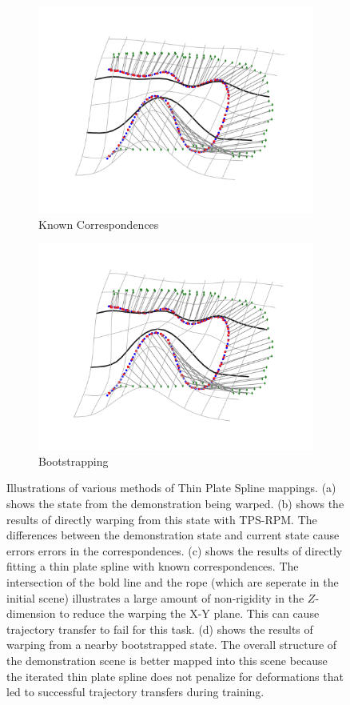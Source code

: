 \begin{figure}
\begin{subfigure}[b]{.48\linewidth}
    \includegraphics[width=\textwidth]{figs/warp_root_known.pdf}
    \caption{Known Correspondences}
    \label{fig:corresponds}
  \end{subfigure}
  \begin{subfigure}[b]{.48\linewidth}
    \includegraphics[width=\textwidth]{figs/warp_derived.pdf}
    \caption{Bootstrapping}
    \label{fig:bootstrap}
  \end{subfigure}
  \caption{Illustrations of various methods of Thin Plate Spline mappings.
  (a) shows the state from the demonstration being warped. (b) shows the results of directly warping from this state with TPS-RPM. The differences between the demonstration state and current state cause errors errors in the correspondences. (c) shows the results of directly fitting a thin plate spline with known correspondences. The intersection of the bold line and the rope (which are seperate in the initial scene) illustrates a large amount of non-rigidity in the $Z$-dimension to reduce the warping the X-Y plane. This can cause trajectory transfer to fail for this task. (d) shows the results of warping from a nearby bootstrapped state. The overall structure of the demonstration scene is better mapped into this scene because the iterated thin plate spline does not penalize for deformations that led to successful trajectory transfers during training.}
  \label{fig:warps}
\end{figure}

